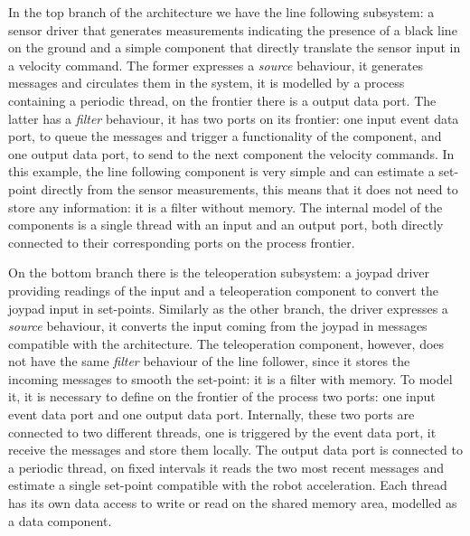 In the top branch of the architecture we have the line following subsystem: a sensor driver that generates measurements indicating the presence of a black line on the ground and a simple component that directly translate the sensor input in a velocity command. The former expresses a \textit{source} behaviour, it generates messages and circulates them in the system, it is modelled by a process containing a periodic thread, on the frontier there is a output data port. The latter has a \textit{filter} behaviour, it has two ports on its frontier: one input event data port, to queue the messages and trigger a functionality of the component, and one output data port, to send to the next component the velocity commands. In this example, the line following component is very simple and can estimate a set-point directly from the sensor measurements, this means that it does not need to store any information: it is a filter without memory. The internal model of the components is a single thread with an input and an output port, both directly connected to their corresponding ports on the process frontier.

On the bottom branch there is the teleoperation subsystem: a joypad driver providing readings of the input and a teleoperation component to convert the joypad input in set-points. Similarly as the other branch, the driver expresses a \textit{source} behaviour, it converts the input coming from the joypad in messages compatible with the architecture. The teleoperation component, however, does not have the same \textit{filter} behaviour of the line follower, since it stores the incoming messages to smooth the set-point: it is a filter with memory. To model it, it is necessary to define on the frontier of the process two ports: one input event data port and one output data port. Internally, these two ports are connected to two different threads, one is triggered by the event data port, it receive the messages and store them locally. The output data port is connected to a periodic thread, on fixed intervals it reads the two most recent messages and estimate a single set-point compatible with the robot acceleration. Each thread has its own data access to write or read on the shared memory area, modelled as a data component.

